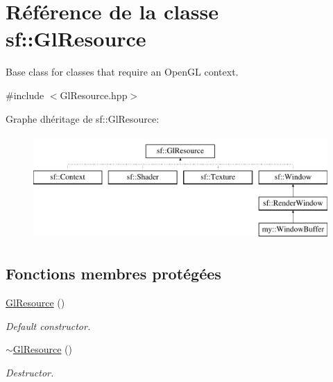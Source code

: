 \hypertarget{classsf_1_1GlResource}{}\section{Référence de la classe sf\+:\+:Gl\+Resource}
\label{classsf_1_1GlResource}


Base class for classes that require an Open\+GL context.  




{\ttfamily \#include $<$Gl\+Resource.\+hpp$>$}

Graphe d\textquotesingle{}héritage de sf\+:\+:Gl\+Resource\+:\begin{figure}[H]
\begin{center}
\leavevmode
\includegraphics[height=4.000000cm]{classsf_1_1GlResource}
\end{center}
\end{figure}
\subsection*{Fonctions membres protégées}
\begin{DoxyCompactItemize}
\item 
\mbox{\label{classsf_1_1GlResource_ad8fb7a0674f0f77e530dacc2a3b0dc6a}} 
\hyperlink{classsf_1_1GlResource_ad8fb7a0674f0f77e530dacc2a3b0dc6a}{Gl\+Resource} ()
\begin{DoxyCompactList}\small\item\em Default constructor. \end{DoxyCompactList}\item 
\mbox{\label{classsf_1_1GlResource_ab99035b67052331d1e8cf67abd93de98}} 
\hyperlink{classsf_1_1GlResource_ab99035b67052331d1e8cf67abd93de98}{$\sim$\+Gl\+Resource} ()
\begin{DoxyCompactList}\small\item\em Destructor. \end{DoxyCompactList}\end{DoxyCompactItemize}
